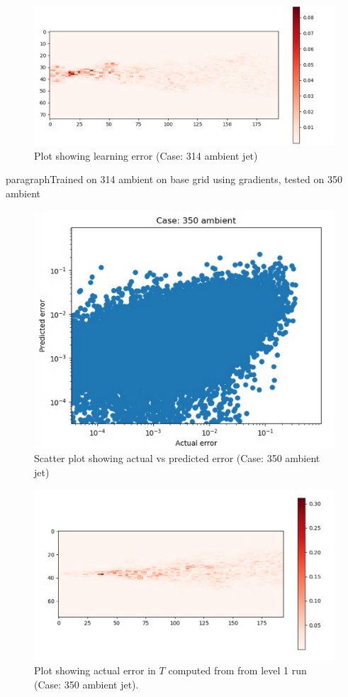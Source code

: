 \documentclass{article}
\begin{document}
\begin{figure}[h!]
    \centering
    \includegraphics[width = 0.9\linewidth]{figures/314_01_cnn_grad_error.png}
    \caption{Plot showing learning error (Case: 314 ambient jet)}
    \label{amr_err}
\end{figure}

paragraph{Trained on 314 ambient on base grid using gradients, tested on 350 ambient}

\begin{figure}[h!]
    \centering
    \includegraphics[width=0.6\linewidth]{figures/314_350_01_cnn_grad_error_scatter.png}
    \caption{Scatter plot showing actual vs predicted error (Case: 350 ambient jet)}
    \label{amr_err}
\end{figure}

\begin{figure}[h!]
    \centering
    \includegraphics[width =0.85\linewidth]{figures/314_350_01_cnn_grad_actual.png}
    \caption{Plot showing actual error in $T$ computed from from level 1 run (Case: 350 ambient jet).}
    \label{amr_err}
\end{figure}
\end{document}
